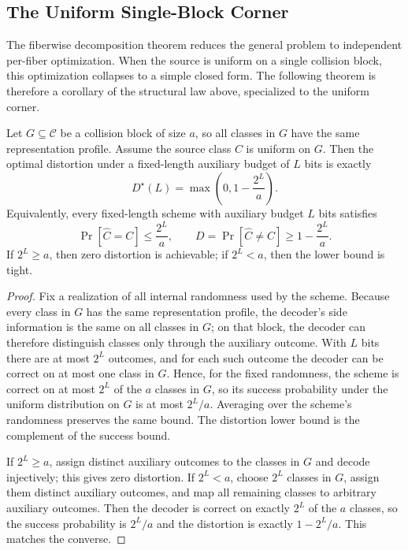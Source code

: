 \subsection{The Uniform Single-Block Corner}

The fiberwise decomposition theorem reduces the general problem to independent per-fiber optimization. When the source is uniform on a single collision block, this optimization collapses to a simple closed form. The following theorem is therefore a corollary of the structural law above, specialized to the uniform corner.

\begin{theorem}\label{thm:semantic-identity-rate-distortion}
Let $G \subseteq \mathcal{C}$ be a collision block of size $a$, so all classes in $G$ have the same representation profile. Assume the source class $C$ is uniform on $G$. Then the optimal distortion under a fixed-length auxiliary budget of $L$ bits is exactly
\[
D^\star(L)=\max\!\left(0, 1 - \frac{2^L}{a}\right).
\]
Equivalently, every fixed-length scheme with auxiliary budget $L$ bits satisfies
\[
\Pr[\hat C = C] \le \frac{2^L}{a},
\qquad
D = \Pr[\hat C \neq C] \ge 1 - \frac{2^L}{a}.
\]
If $2^L \ge a$, then zero distortion is achievable; if $2^L < a$, then the lower bound is tight.
\end{theorem}

\begin{proof}
Fix a realization of all internal randomness used by the scheme. Because every class in $G$ has the same representation profile, the decoder's side information is the same on all classes in $G$; on that block, the decoder can therefore distinguish classes only through the auxiliary outcome. With $L$ bits there are at most $2^L$ outcomes, and for each such outcome the decoder can be correct on at most one class in $G$. Hence, for the fixed randomness, the scheme is correct on at most $2^L$ of the $a$ classes in $G$, so its success probability under the uniform distribution on $G$ is at most $2^L/a$. Averaging over the scheme's randomness preserves the same bound. The distortion lower bound is the complement of the success bound.

If $2^L \ge a$, assign distinct auxiliary outcomes to the classes in $G$ and decode injectively; this gives zero distortion. If $2^L < a$, choose $2^L$ classes in $G$, assign them distinct auxiliary outcomes, and map all remaining classes to arbitrary auxiliary outcomes. Then the decoder is correct on exactly $2^L$ of the $a$ classes, so the success probability is $2^L/a$ and the distortion is exactly $1-2^L/a$. This matches the converse.
\end{proof}

